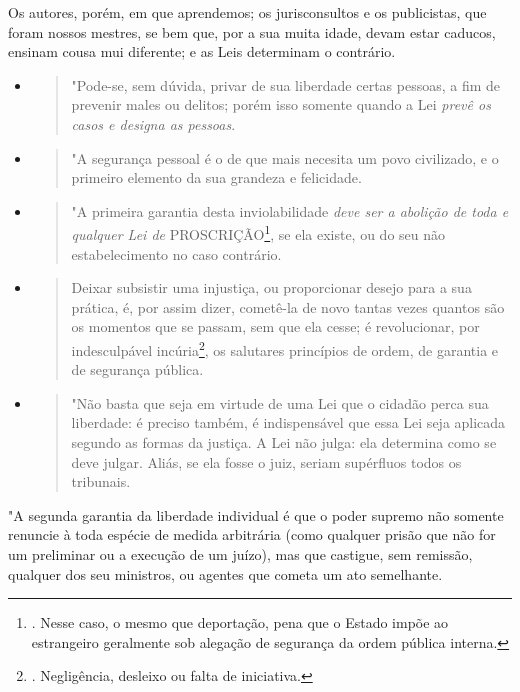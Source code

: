 Os autores, porém, em que aprendemos; os jurisconsultos e os
publicistas, que foram nossos mestres, se bem que, por a sua muita
idade, devam estar caducos, ensinam cousa mui diferente; e as Leis
determinam o contrário.

\begin{itemize}
\item
  \begin{quote}
  "Pode-se, sem dúvida, privar de sua liberdade certas pessoas, a fim de
  prevenir males ou delitos; porém isso somente quando a Lei \emph{prevê
  os casos e designa as pessoas}.
  \end{quote}
\item
  \begin{quote}
  "A segurança pessoal é o de que mais necesita um povo civilizado, e o
  primeiro elemento da sua grandeza e felicidade.
  \end{quote}
\item
  \begin{quote}
  "A primeira garantia desta inviolabilidade \emph{deve ser a abolição
  de toda e qualquer Lei de} PROSCRIÇÃO\footnote{. Nesse caso, o mesmo
    que deportação, pena que o Estado impõe ao estrangeiro geralmente
    sob alegação de segurança da ordem pública interna.}, se ela existe,
  ou do seu não estabelecimento no caso contrário.
  \end{quote}
\item
  \begin{quote}
  Deixar subsistir uma injustiça, ou proporcionar desejo para a sua
  prática, é, por assim dizer, cometê-la de novo tantas vezes quantos
  são os momentos que se passam, sem que ela cesse; é revolucionar, por
  indesculpável incúria\footnote{. Negligência, desleixo ou falta de
    iniciativa.}, os salutares princípios de ordem, de garantia e de
  segurança pública.
  \end{quote}
\item
  \begin{quote}
  "Não basta que seja em virtude de uma Lei que o cidadão perca sua
  liberdade: é preciso também, é indispensável que essa Lei seja
  aplicada segundo as formas da justiça. A Lei não julga: ela determina
  como se deve julgar. Aliás, se ela fosse o juiz, seriam supérfluos
  todos os tribunais.
  \end{quote}
\end{itemize}

"A segunda garantia da liberdade individual é que o poder supremo não
somente renuncie à toda espécie de medida arbitrária (como qualquer
prisão que não for um preliminar ou a execução de um juízo), mas que
castigue, sem remissão, qualquer dos seu ministros, ou agentes que
cometa um ato semelhante.

